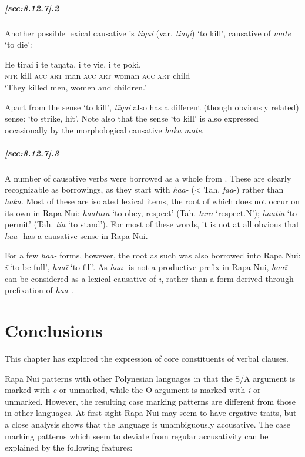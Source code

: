 \subparagraph{\ref{sec:8.12.7}.2} Another possible lexical causative is \textit{tiŋa{\ꞌ}i} (var. \textit{tiaŋi}) ‘to kill’, causative of \textit{mate} ‘to die’:

\ea\label{ex:8.257}
\gll He tiŋa{\ꞌ}i i te taŋata, i te vi{\ꞌ}e, i te poki.\\
\textsc{ntr} kill \textsc{acc} \textsc{art} man \textsc{acc} \textsc{art} woman \textsc{acc} \textsc{art} child\\

\glt
‘They killed men, women and children.’ \textstyleExampleref{[Mtx-3-01.250]}
\z

Apart from the sense ‘to kill’, \textit{tīŋa{\ꞌ}i} also has a different (though obviously related) sense: ‘to strike, hit’. Note also that the sense ‘to kill’ is also expressed occasionally by the morphological causative \textit{haka mate}.

\subparagraph{\ref{sec:8.12.7}.3} A number of causative verbs were borrowed as a whole from . These are clearly recognizable as borrowings, as they start with \textit{ha{\ꞌ}a-} ({\textless} Tah. \textit{fa{\ꞌ}a}{}-) rather than \textit{haka}. Most of these are isolated lexical items, the root of which does not occur on its own in Rapa Nui: \textit{ha{\ꞌ}atura} ‘to obey, respect’ (Tah. \textit{tura} ‘respect.N’); \textit{ha{\ꞌ}ati{\ꞌ}a} ‘to permit’ (Tah. \textit{ti{\ꞌ}a} ‘to stand’). For most of these words, it is not at all obvious that \textit{ha{\ꞌ}a-} has a causative sense in Rapa Nui.

For a few \textit{ha{\ꞌ}a-} forms, however, the root as such was also borrowed into Rapa Nui: \textit{{\ꞌ}ī} ‘to be full’, \textit{ha{\ꞌ}a{\ꞌ}ī} ‘to fill’. As \textit{ha{\ꞌ}a-} is not a productive prefix in Rapa Nui, \textit{ha{\ꞌ}a{\ꞌ}ī} can be considered as a lexical causative of \textit{{\ꞌ}ī}, rather than a form derived through prefixation of \textit{ha{\ꞌ}a-}.

\section{Conclusions}\label{sec:8.13}
\largerpage[2]
This chapter has explored the expression of core constituents of verbal clauses.

Rapa Nui patterns with other Polynesian languages in that the S/A argument is marked with \textit{e} or unmarked, while the O argument is marked with \textit{i} or unmarked. However, the resulting case marking patterns are different from those in other languages. At first sight Rapa Nui may seem to have ergative traits, but a close analysis shows that the language is unambiguously accusative. The case marking patterns which seem to deviate from regular accusativity can be explained by the following features:

